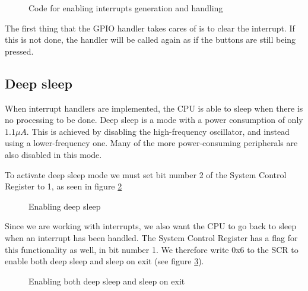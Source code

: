 \begin{figure}[h!]
\caption{Code for enabling interrupts generation and handling}
\label{code:interrupt_setup}
\end{figure}


The first thing that the GPIO handler takes cares of is to clear the interrupt. If this is not done, the handler will be called again as if the buttons are still being pressed.

\subsection{Deep sleep}
\label{subsec:dev_pros_deep_sleep}

When interrupt handlers are implemented, the CPU is able to sleep when there is no processing to be done.
Deep sleep is a mode with a power consumption of only $1.1 \mu A$.
This is achieved by disabling the high-frequency oscillator, and instead using a lower-frequency one.
Many of the more power-consuming peripherals are also disabled in this mode.

To activate deep sleep mode we must set bit number 2 of the System Control Register to 1, as seen in figure \ref{code:deep_sleep}

\begin{figure}[h!]
\caption{Enabling deep sleep}
\label{code:deep_sleep}
\end{figure}

Since we are working with interrupts, we also want the CPU to go back to sleep when an interrupt has been handled.
The System Control Register has a flag for this functionality as well, in bit number 1.
We therefore write 0x6 to the SCR to enable both deep sleep and sleep on exit (see figure \ref{code:deep_sleep_on_exit}).

\begin{figure}[h!]
\caption{Enabling both deep sleep and sleep on exit}
\label{code:deep_sleep_on_exit}
\end{figure}
